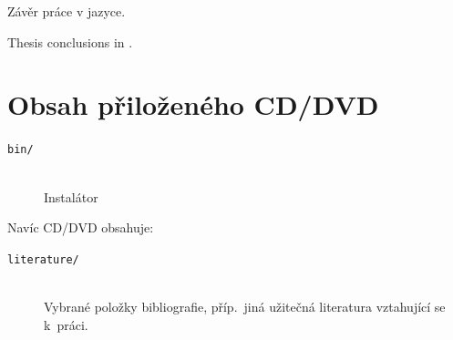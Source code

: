 \documentclass[
  biblatex,
  glossaries,
  index
]{kidiplom}
\begin{document}
\begin{kiconclusions}
Závěr práce v  jazyce.
\end{kiconclusions}

\begin{kiconclusions}[english]
Thesis conclusions in .
\end{kiconclusions}

\appendix

\section{Obsah přiloženého CD/DVD} \label{sec:ObsahCD}

\begin{description}

\item[\texttt{bin/}] \hfill \\
  Instalátor

\end{description}

Navíc CD/DVD obsahuje:

\begin{description}

\item[\texttt{literature/}] \hfill \\
  Vybrané položky bibliografie, příp.~jiná užitečná literatura
  vztahující se k~práci.

\end{description}


\printglossary


\nocite{*}
\printbibliography
\end{document}
